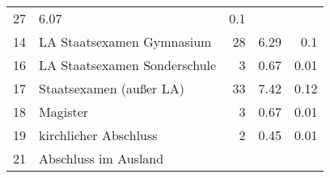 \begin{longtable}{lXrrr}
       \num{27} &
       \num[round-mode=places,round-precision=2]{6,07} &
         \num[round-mode=places,round-precision=2]{0,1} \\

     14 &
     \multicolumn{1}{X}{ LA Staatsexamen Gymnasium   } &


       \num{28} &
       \num[round-mode=places,round-precision=2]{6,29} &
         \num[round-mode=places,round-precision=2]{0,1} \\

     16 &
     \multicolumn{1}{X}{ LA Staatsexamen Sonderschule   } &


       \num{3} &
       \num[round-mode=places,round-precision=2]{0,67} &
         \num[round-mode=places,round-precision=2]{0,01} \\

     17 &
     \multicolumn{1}{X}{ Staatsexamen (außer LA)   } &


       \num{33} &
       \num[round-mode=places,round-precision=2]{7,42} &
         \num[round-mode=places,round-precision=2]{0,12} \\

     18 &
     \multicolumn{1}{X}{ Magister   } &


       \num{3} &
       \num[round-mode=places,round-precision=2]{0,67} &
         \num[round-mode=places,round-precision=2]{0,01} \\

     19 &
     \multicolumn{1}{X}{ kirchlicher Abschluss   } &


       \num{2} &
       \num[round-mode=places,round-precision=2]{0,45} &
         \num[round-mode=places,round-precision=2]{0,01} \\

     21 &
     \multicolumn{1}{X}{ Abschluss im Ausland   } &



\end{longtable}
